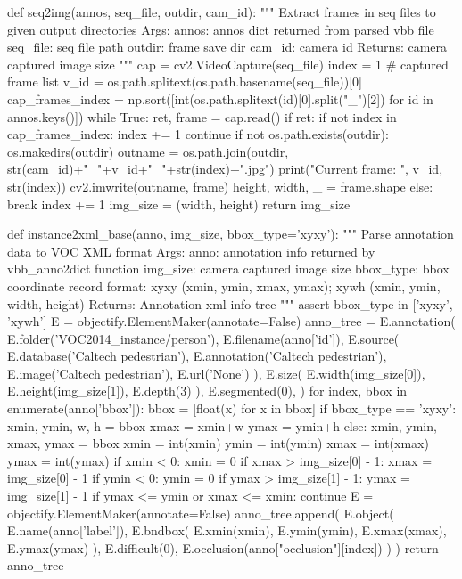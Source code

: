 \begin{pythoncode}
def seq2img(annos, seq_file, outdir, cam_id):
    """
    Extract frames in seq files to given output directories
    Args:
         annos: annos dict returned from parsed vbb file
         seq_file: seq file path
         outdir: frame save dir
         cam_id: camera id
    Returns:
        camera captured image size
    """
    cap = cv2.VideoCapture(seq_file)
    index = 1
    # captured frame list
    v_id = os.path.splitext(os.path.basename(seq_file))[0]
    cap_frames_index = np.sort([int(os.path.splitext(id)[0].split("_")[2]) for id in annos.keys()])
    while True:
        ret, frame = cap.read()
        if ret:
            if not index in cap_frames_index:
                index += 1
                continue
            if not os.path.exists(outdir):
                os.makedirs(outdir)
            outname = os.path.join(outdir, str(cam_id)+"_"+v_id+"_"+str(index)+".jpg")
            print("Current frame: ", v_id, str(index))
            cv2.imwrite(outname, frame)
            height, width, _ = frame.shape
        else:
            break
        index += 1
    img_size = (width, height)
    return img_size


def instance2xml_base(anno, img_size, bbox_type='xyxy'):
    """
    Parse annotation data to VOC XML format
    Args:
        anno: annotation info returned by vbb_anno2dict function
        img_size: camera captured image size
        bbox_type: bbox coordinate record format: xyxy (xmin, ymin, xmax, ymax); xywh (xmin, ymin, width, height)
    Returns:
        Annotation xml info tree
    """
    assert bbox_type in ['xyxy', 'xywh']
    E = objectify.ElementMaker(annotate=False)
    anno_tree = E.annotation(
        E.folder('VOC2014_instance/person'),
        E.filename(anno['id']),
        E.source(
            E.database('Caltech pedestrian'),
            E.annotation('Caltech pedestrian'),
            E.image('Caltech pedestrian'),
            E.url('None')
        ),
        E.size(
            E.width(img_size[0]),
            E.height(img_size[1]),
            E.depth(3)
        ),
        E.segmented(0),
    )
    for index, bbox in enumerate(anno['bbox']):
        bbox = [float(x) for x in bbox]
        if bbox_type == 'xyxy':
            xmin, ymin, w, h = bbox
            xmax = xmin+w
            ymax = ymin+h
        else:
            xmin, ymin, xmax, ymax = bbox
        xmin = int(xmin)
        ymin = int(ymin)
        xmax = int(xmax)
        ymax = int(ymax)
        if xmin < 0:
            xmin = 0
        if xmax > img_size[0] - 1:
            xmax = img_size[0] - 1
        if ymin < 0:
            ymin = 0
        if ymax > img_size[1] - 1:
            ymax = img_size[1] - 1
        if ymax <= ymin or xmax <= xmin:
            continue
        E = objectify.ElementMaker(annotate=False)
        anno_tree.append(
            E.object(
            E.name(anno['label']),
            E.bndbox(
                E.xmin(xmin),
                E.ymin(ymin),
                E.xmax(xmax),
                E.ymax(ymax)
            ),
            E.difficult(0),
            E.occlusion(anno["occlusion"][index])
            )
        )
    return anno_tree



\end{pythoncode}
